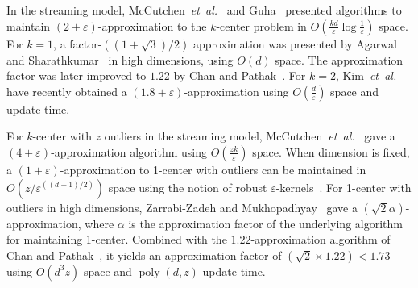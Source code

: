 \documentclass[envcountsame]{cls/cccg15}
\renewcommand{\O}{\ensuremath{{O}}}
\newcommand{\poly}{\mathop{\mathrm{poly}}}
\newcommand{\eps}{\varepsilon}
\newcommand{\etal}{{\em et~al.\/}}
\begin{document}
In the streaming model, McCutchen~\etal~\cite{mccutchen2008streaming} 
and Guha~\cite{guha2009tight} presented algorithms to maintain $(2+\eps)$-approximation 
to the $k$-center problem in %
$\O(\frac{kd}{\eps} \log \frac{1}{\eps})$ space.
For $k=1$, %
a factor-$((1+\sqrt{3})/{2})$ approximation 
was presented by Agarwal and Sharathkumar~\cite{agarwal2010streaming} 
in high dimensions, using $O(d)$ space. 
The approximation factor was later improved 
to $1.22$ by Chan and Pathak~\cite{chan2014streaming}.
For $k=2$, Kim~\etal~\cite{kim2014improved} 
have recently obtained a $(1.8+\eps)$-approximation  
using $\O(\frac{d}{\eps})$ space and update time.

For $k$-center with $z$ outliers in the streaming model, 
McCutchen~\etal~\cite{mccutchen2008streaming} 
gave a $(4+\eps)$-approximation 
algorithm using $\O(\frac{zk}{\eps})$ space.
When dimension is fixed, a $(1 + \eps)$-approximation to 1-center with outliers
can be maintained in $\O({z}/{\eps^{((d-1)/2)}})$ space 
using the notion of robust $\eps$-kernels~\cite{agarwal2007space, zarrabi2011almost}.
For 1-center with outliers in high dimensions, 
Zarrabi-Zadeh and Mukhopadhyay~\cite{zarrabi2009streaming} 
gave a $(\sqrt{2}\alpha)$-approximation, 
where $\alpha$ is the approximation factor of the underlying algorithm for maintaining 1-center. 
Combined with the $1.22$-approximation algorithm of Chan and Pathak~\cite{chan2014streaming},
it yields an approximation factor of $(\sqrt{2} \times 1.22) < 1.73$ 
using $O(d^3z)$ space and $\poly(d,z)$ update time.
\end{document}
